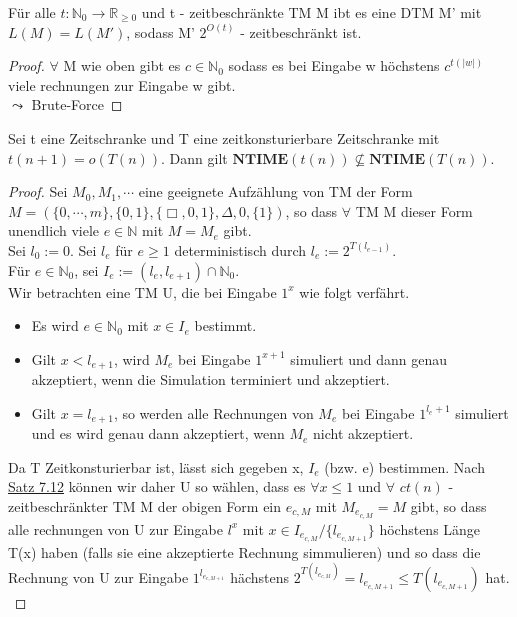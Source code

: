     Für alle \(t:\mathbb{N}_0 \to \mathbb{R}_{\geq 0}\) und t - zeitbeschränkte TM M ibt es eine DTM M' mit \(L(M) = L(M')\), sodass M' \(2^{O(t)}\) - zeitbeschränkt ist.
    \begin{proof}
        \(\forall\) M wie oben gibt es \(c \in \mathbb{N}_0\) sodass es bei Eingabe w höchstens \(c^{t(|w|)}\) viele rechnungen zur Eingabe w gibt. \\
        \(\leadsto\) Brute-Force
    \end{proof}

    Sei t eine Zeitschranke und T eine zeitkonsturierbare Zeitschranke mit \(t(n+1) = o(T(n))\). Dann gilt \(\textbf{NTIME}(t(n)) \not \subseteq \textbf{NTIME}(T(n))\). 
    \begin{proof}
        Sei \(M_0, M_1, \cdots\) eine geeignete Aufzählung von TM der Form \(M = (\{0, \cdots, m\}, \{0, 1\}, \{\Box, 0, 1\}, \Delta, 0, \{1\})\), so dass \(\forall\) TM M dieser Form unendlich viele \(e \in \mathbb{N}\) mit \(M = M_e\) gibt.\\
        Sei \(l_0 := 0\). Sei \(l_e\) für \(e \geq 1\) deterministisch durch \(l_e := 2^{T(l_{e-1})}\).\\
        Für \(e \in \mathbb{N}_0\), sei \(I_e := (l_e, l_{e+1}) \cap \mathbb{N}_0\).\\
        Wir betrachten eine TM U, die bei Eingabe \(1^x\) wie folgt verfährt.
        \begin{itemize}
            \item Es wird \(e\in\mathbb{N}_0\) mit \(x \in I_e\) bestimmt.
            \item Gilt \(x < l_{e+1}\), wird \(M_e\) bei Eingabe \(1^{x+1}\) simuliert und dann genau akzeptiert, wenn die Simulation terminiert und akzeptiert.
            \item Gilt \(x = l_{e+1}\), so werden alle Rechnungen von \(M_e\) bei Eingabe \(1^{l_e +1}\) simuliert und es wird genau dann akzeptiert, wenn \(M_e\) nicht akzeptiert. 
        \end{itemize}
        Da T Zeitkonsturierbar ist, lässt sich gegeben x, \(I_e\) (bzw. e) bestimmen. Nach \hyperref[subsec:7.12]{Satz 7.12} können wir daher U so wählen, dass es \(\forall x \leq 1\) und \(\forall\) \(ct(n)\) - zeitbeschränkter TM M der obigen Form ein \(e_{c,M}\) mit \(M_{e_{c,M}} = M\) gibt, so dass alle rechnungen von U zur Eingabe \(l^x\) mit \(x \in I_{e_{c, M}} / \{l_{e_{c,M + 1}}\}\) höchstens Länge T(x) haben (falls sie eine akzeptierte Rechnung simmulieren) und so dass die Rechnung von U zur Eingabe \(1^{l_{e_{c,M + 1}}}\) hächstens \(2^{T(l_{e_{c,M}})} = l_{e_{c,M + 1}} \leq T(l_{e_{c, M +1}})\) hat.\\

\end{proof}
